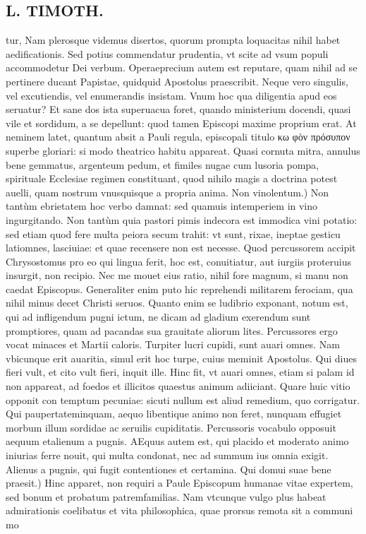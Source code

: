 \documentclass{article}
\begin{document}
\begin{pages}
\section*{L. TIMOTH. }
\marginpar{[ p.34 ]}\pstart tur, Nam plerosque videmus disertos, quorum prompta loquacitas nihil habet aedificationis. Sed potius commendatur prudentia, vt scite ad vsum populi accommodetur Dei verbum. Operaeprecium autem est reputare, quam nihil ad se pertinere ducant Papistae, quidquid Apostolus praescribit. Neque vero singulis, vel excutiendis, vel enumerandis insistam. Vnum hoc qua diligentia apud eos seruatur? Et sane dos ista superuacua foret, quando ministerium docendi, quasi vile et sordidum, a se depellunt: quod tamen Episcopi maxime proprium erat. At neminem latet, quantum absit a Pauli regula, episcopali titulo κω φὸν πρόσυπον superbe gloriari: si modo theatrico habitu appareat. Quasi cornuta mitra, annulus bene gemmatus, argenteum pedum, et fimiles nugae cum lusoria pompa, spirituale Ecclesiae regimen constituant, quod nihilo magis a doctrina potest auelli, quam nostrum vnusquisque a propria anima.  \pend\pstart Non vinolentum.) Non tantùm ebrietatem hoc verbo damnat: sed quamuis intemperiem in vino ingurgitando. Non tantùm quia pastori pimis indecora est immodica vini potatio: sed etiam quod fere multa peiora secum trahit: vt sunt, rixae, ineptae gesticu latiomnes, lasciuiae: et quae recensere non est necesse. Quod percussorem accipit Chrysostomus pro eo qui lingua ferit, hoc est, conuitiatur, aut iurgiis proteruius insurgit, non recipio. Nec me mouet eius ratio, nihil fore magnum, si manu non caedat Episcopus. Generaliter enim puto hic reprehendi militarem ferociam, qua nihil minus decet Christi seruos. Quanto enim se ludibrio exponant, notum est, qui ad infligendum pugni ictum, ne dicam ad gladium exerendum sunt promptiores, quam ad pacandas sua grauitate aliorum lites. Percussores ergo vocat minaces et Martii caloris. Turpiter lucri cupidi, sunt auari omnes. Nam vbicunque erit auaritia, simul erit hoc turpe, cuius meminit Apostolus. Qui diues fieri vult, et cito vult fieri, inquit ille. Hinc fit, vt auari omnes, etiam si palam id non appareat, ad foedos et illicitos quaestus animum adiiciant. Quare huic vitio opponit con temptum pecuniae: sicuti nullum est aliud remedium, quo corrigatur. Qui paupertateminquam, aequo libentique animo non feret, nunquam effugiet morbum illum sordidae ac seruilis cupiditatis. Percussoris vocabulo opposuit aequum etalienum a pugnis. AEquus autem est, qui placido et moderato animo iniurias ferre nouit, qui multa condonat, nec ad summum ius omnia exigit. Alienus a pugnis, qui fugit contentiones et certamina.  \pend\pstart Qui domui suae bene praesit.) Hinc apparet, non requiri a Paule Episcopum humanae vitae expertem, sed bonum et probatum patremfamilias. Nam vtcunque vulgo plus habeat admirationis coelibatus et vita philosophica, quae prorsus remota sit a communi mo\pend

\end{pages}
\end{document}
